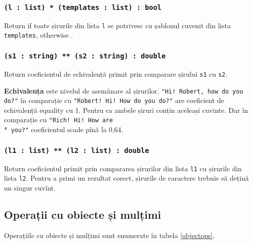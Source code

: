 \subsubsection{\texttt{(l : list) * (templates : list) : bool}}

Return \true{} if toate șirurile din lista \texttt{l} se potrivesc cu șablonul cuvenit din lista \texttt{templates}, otherwise \false{}.

\subsubsection{\texttt{(s1 : string) ** (s2 : string) : double}}

Return coeficientul de echivalență primit prin comparare șirului \texttt{s1} cu \texttt{s2}.

{\bf Echivalența} este nivelul de asemănare al șirurilor. \texttt{"Hi! Robert, how do you do?"} în comparație cu \texttt{"Robert! Hi! How do you do?"} are coeficient de echivalență equality cu 1. Pentru ca ambele șiruri conțin aceleași cuvinte. Dar în comparație cu  \texttt{"Rich! Hi! How are}\\*\texttt{ you?"} coeficientul scade pînă la 0,64.

\subsubsection{\texttt{(l1 : list) ** (l2 : list) : double}}

Return coeficientul primit prin compararea șirurilor din lista \texttt{l1} cu șirurile din lista \texttt{l2}.
Pentru a primi un rezultat corect, șirurile de caractere trebuie să dețină un singur cuvînt.

\subsection{Operații cu obiecte și mulțimi}

Operațiile cu obiecte și mulțimi sunt enumerate în tabela \ref{objectops}.

